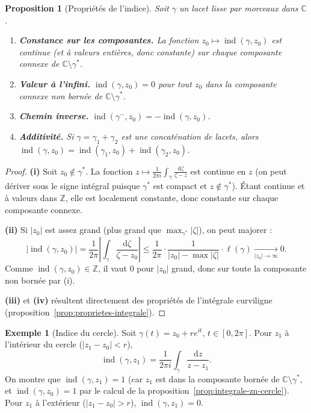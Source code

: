 \documentclass[12pt,a4paper,openany]{book}
\theoremstyle{definition}
\newtheorem{exemple}[definition]{Exemple}
\theoremstyle{plain}
\newtheorem{proposition}[definition]{Proposition}
\theoremstyle{remark}
\newcommand{\C}{\mathbb{C}}
\newcommand{\Z}{\mathbb{Z}}
\DeclareMathOperator{\ind}{ind}
\newcommand{\dd}{\mathrm{d}}
\newcommand{\abs}[1]{\left|#1\right|}
\begin{document}
\begin{proposition}[Propriétés de l'indice]\label{prop:proprietes-indice}
Soit $\gamma$ un lacet lisse par morceaux dans $\C$.
\begin{enumerate}[label=\textup{(\roman*)}]
  \item \textbf{Constance sur les composantes.} La fonction
    $z_0 \mapsto \ind(\gamma, z_0)$ est continue (et à valeurs entières, donc
    constante) sur chaque composante connexe de $\C \setminus \gamma^*$.
  \item \textbf{Valeur à l'infini.} $\ind(\gamma, z_0) = 0$ pour tout
    $z_0$ dans la composante connexe non bornée de $\C \setminus \gamma^*$.
  \item \textbf{Chemin inverse.} $\ind(\gamma^-, z_0) = -\ind(\gamma, z_0)$.
  \item \textbf{Additivité.} Si $\gamma = \gamma_1 + \gamma_2$ est une
    concaténation de lacets, alors
    $\ind(\gamma, z_0) = \ind(\gamma_1, z_0) + \ind(\gamma_2, z_0)$.
\end{enumerate}
\end{proposition}

\begin{proof}
\textbf{(i)} Soit $z_0 \notin \gamma^*$. La fonction $z \mapsto
\frac{1}{2\pi i} \int_\gamma \frac{\dd\zeta}{\zeta - z}$ est continue en $z$
(on peut dériver sous le signe intégral puisque $\gamma^*$ est compact et
$z \notin \gamma^*$). Étant continue et à valeurs dans $\Z$, elle est
localement constante, donc constante sur chaque composante connexe.

\textbf{(ii)} Si $\abs{z_0}$ est assez grand (plus grand que $\max_{\gamma^*}
\abs{\zeta}$), on peut majorer :
\[
  \abs{\ind(\gamma, z_0)}
  = \frac{1}{2\pi}\abs{\int_\gamma \frac{\dd\zeta}{\zeta - z_0}}
  \leq \frac{1}{2\pi} \cdot
    \frac{1}{\abs{z_0} - \max\abs{\zeta}} \cdot \ell(\gamma)
  \xrightarrow[\abs{z_0}\to\infty]{} 0.
\]
Comme $\ind(\gamma, z_0) \in \Z$, il vaut $0$ pour $\abs{z_0}$ grand, donc
sur toute la composante non bornée par (i).

\textbf{(iii)} et \textbf{(iv)} résultent directement des propriétés de
l'intégrale curviligne (proposition~\ref{prop:proprietes-integrale}).
\end{proof}

\begin{exemple}[Indice du cercle]\label{ex:indice-cercle}
Soit $\gamma(t) = z_0 + re^{it}$, $t \in [0, 2\pi]$. Pour $z_1$ à
l'intérieur du cercle ($\abs{z_1 - z_0} < r$),
\[
  \ind(\gamma, z_1) = \frac{1}{2\pi i}\int_\gamma \frac{\dd z}{z - z_1}.
\]
On montre que $\ind(\gamma, z_1) = 1$ (car $z_1$ est dans la composante
bornée de $\C \setminus \gamma^*$, et $\ind(\gamma, z_0) = 1$ par le calcul
de la proposition~\ref{prop:integrale-zn-cercle}).
Pour $z_1$ à l'extérieur ($\abs{z_1 - z_0} > r$), $\ind(\gamma, z_1) = 0$.
\end{exemple}
\end{document}
